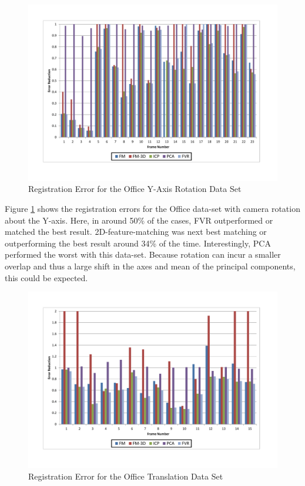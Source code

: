 \begin{figure}[t]
\centering
\includegraphics[width=6.0in]{images/results/Office_Texture_Rotation}
\caption{Registration Error for the Office Y-Axis Rotation Data Set}
\label{fig:PET11}
\end{figure}

Figure \ref{fig:PET11} shows the registration errors for the Office data-set with camera rotation about the Y-axis. Here, in around 50\% of the cases, FVR outperformed or matched the best result. 2D-feature-matching was next best matching or outperforming the best result around 34\% of the time. Interestingly, PCA performed the worst with this data-set. Because rotation can incur a smaller overlap and thus a large shift in the axes and mean of the principal components, this could be expected.

\begin{figure}[t]
\centering
\includegraphics[width=6.0in]{images/results/Office_Texture_Translation}
\caption{Registration Error for the Office Translation Data Set}
\label{fig:PET12}
\end{figure}

